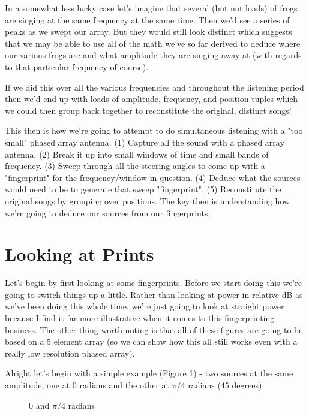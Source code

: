 \documentclass[10pt,a5paper]{book}
\begin{document}
In a somewhat less lucky case let's imagine that several (but not loads) of frogs are singing at the same frequency at the same time. Then we'd see a series of peaks as we swept our array. But they would still look distinct which suggests that we may be able to use all of the math we've so far derived to deduce where our various frogs are and what amplitude they are singing away at (with regards to that particular frequency of course). 

If we did this over all the various frequencies and throughout the listening period then we'd end up with loads of amplitude, frequency, and position tuples which we could then group back together to reconstitute the original, distinct songs! 

This then is how we're going to attempt to do simultaneous listening with a "too small" phased array antenna. (1) Capture all the sound with a phased array antenna. (2) Break it up into small windows of time and small bands of frequency. (3) Sweep through all the steering angles to come up with a "fingerprint" for the frequency/window in question. (4) Deduce what the sources would need to be to generate that sweep "fingerprint". (5) Reconstitute the original songs by grouping over positions. The key then is understanding how we're going to deduce our sources from our fingerprints.

\section{Looking at Prints}
Let's begin by first looking at some fingerprints. Before we start doing this we're going to switch things up a little. Rather than looking at power in relative dB as we've been doing this whole time, we're just going to look at straight power because I find it far more illustrative when it comes to this fingerprinting business. The other thing worth noting is that all of these figures are going to be based on a 5 element array (so we can show how this all still works even with a really low resolution phased array). 

Alright let's begin with a simple example (Figure 1) - two sources at the same amplitude, one at 0 radians and the other at $\pi/4$ radians (45 degrees). 

\begin{figure}[!htb]
\caption{\label{fig:my-label} 0 and $\pi/4$ radians}
\end{figure}
\end{document}
